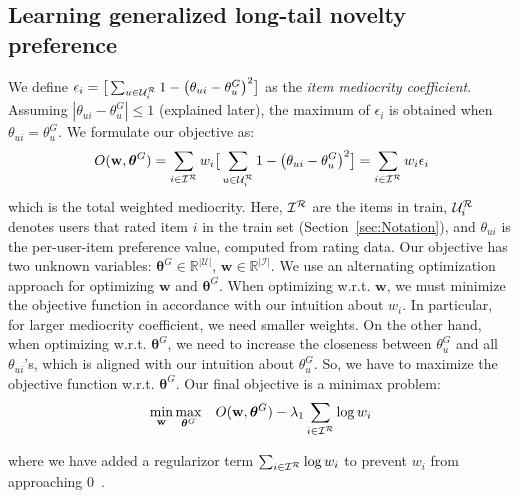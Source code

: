 \subsection{Learning generalized long-tail novelty preference}
\label{sec:learning-lt-pref}
\iffalse
\begin{align}
\small
\epsilon = \sum_{i \in  \itemsinTrainset}  \sum_{u \in \usersofIteminTrainset}   w_i \epsilon_{ui}^2  =  \sum_{i \in  \itemsinTrainset} \sum_{u \in \usersofIteminTrainset} w_i \big( \theta_{ui} -  \theta_{u}^G \big)^2
\label{eq:totalSquaredError}
\end{align}
\fi
We define  $\epsilon_{i} = \big[ \sum_{u \in \mathcal{U}_{i}^{\mathcal{R}}}  1- \big( \theta_{ui} -\theta_u^G\big)^2 \big] $ as  the \textit{item mediocrity coefficient}. Assuming $|\theta_{ui} - \theta_u^G| \leq 1$ (explained later), the maximum  of $\epsilon_i$ is obtained  when $\theta_{ui} = \theta_u^G$.  We formulate our objective as:
\begin{align}
\ O(\mathbf{w},\bm{\theta}^G)= \sum_{i \in  \mathcal{I}^{\mathcal{R}} } w_i \big[ \sum_{u \in \mathcal{U}_{i}^{\mathcal{R}}}  1- \big( \theta_{ui} -\theta_u^G\big)^2 \big] =  \sum_{i \in  \mathcal{I}^{\mathcal{R}} } w_i \epsilon_i \nonumber
\end{align}
which is the total weighted mediocrity. Here, $ \mathcal{I}^{\mathcal{R}}$ are the items in train, $\mathcal{U}_{i}^{\mathcal{R}}$  denotes users that rated item $i$ in the train set (Section~\ref{sec:Notation}), and $\theta_{ui}$  is the per-user-item preference value,  computed from rating data.   Our objective  has two unknown variables: $\bm{\theta}^G \in \mathbb{R}^{|\mathcal{U}|}$, $\mathbf{w} \in \mathbb{R}^{|\mathcal{I}|}$.
We use an alternating optimization approach for optimizing   $\mathbf{w}$ and  $\bm{\theta}^G$. When optimizing w.r.t. $\mathbf{w}$,  we must minimize the objective function in accordance with our intuition about $w_i$. In particular, for larger mediocrity coefficient, we need smaller weights. On the other hand, when optimizing w.r.t. $\bm{\theta}^G$, we need to increase the closeness between $\theta_u^G$ and all $\theta_{ui}$'s, which is aligned with our intuition about $\theta_u^G$. So, we have to maximize the objective function w.r.t.  $\bm{\theta}^G$.  Our final objective is a minimax problem:  
\begin{align}
&\min_{\mathbf{w}} \max_{\bm{\theta}^G} &  O(\mathbf{w},\bm{\theta}^G)  - \lambda_1 \sum_{i \in \mathcal{I}^{\mathcal{R}} } \log{w_i}   
\label{eq:thetaStarOpt}
\end{align}
\iffalse
\begin{align}
\min_{\mathbf{w}} \max_{\bm{\theta}^G}\ O(\mathbf{w},\bm{\theta}^G)= \sum_{i \in  \itemsinTrainset } w_i \big[ \sum_{u \in \usersofIteminTrainset}  - \big( \theta_{ui} -\theta_u^G\big)^2 \big] 
\label{eq:thetaStarOpt}
\end{align}
\fi
where we have added a regularizor term $\sum_{i \in \mathcal{I}^{\mathcal{R}} } \log{ w_i}$ to  prevent $w_i$ from approaching 0~\cite{li2015discovery}. %

